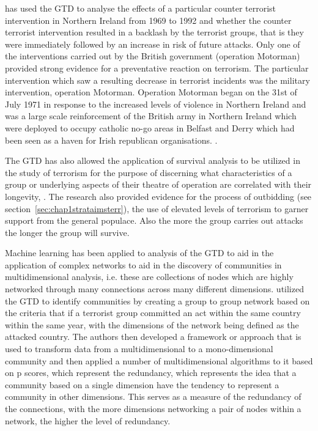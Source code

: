 \citep{lafree2009impact} has used the GTD to analyse the effects of a particular counter terrorist intervention in Northern Ireland from 1969 to 1992 and whether the counter terrorist intervention resulted in a backlash by the terrorist groups, that is they were immediately followed by an increase in risk of future attacks. Only one of the interventions carried out by the British government (operation Motorman) provided strong evidence for a preventative reaction on  terrorism. The particular intervention which saw a resulting decrease in terrorist incidents was the military intervention, operation Motorman. 
Operation Motorman began on the 31st of July 1971 in response to the increased levels of violence in Northern Ireland \citep{edwards2011northern} and was a large scale reinforcement of the British army in Northern Ireland which were deployed to occupy catholic no-go areas in Belfast and Derry which had been seen as a haven for Irish republican organisations. \citep{neumann2003myth}.

The GTD has also allowed the application of survival analysis to be utilized in the study of terrorism for the purpose of discerning what characteristics of a group or underlying aspects of their theatre of operation are correlated with their longevity, \citep{young2014survival}. The  research also provided evidence for the  process of outbidding (see section~\ref{sec:chap1strataimsterr}),  the use of elevated levels of terrorism to garner support from the general populace. Also the more the group carries out attacks the longer the group will survive.

Machine learning has been applied to analysis of the GTD to aid in the application of complex networks to aid in the discovery of communities in multidimensional analysis, i.e. these are collections of nodes which are highly networked through many connections across many different dimensions. \citep{berlingerio2011finding} utilized the GTD to identify communities by creating a group to group network based on the criteria that if a terrorist group committed an act within the same country within the same year, with the dimensions of the network being defined as the attacked country. The authors then developed a framework or approach that is used to transform data from a multidimensional to a mono-dimensional community and then applied a number of multidimensional algorithms to it based on p scores, which represent the redundancy, which represents the idea that a community based on a single dimension have the tendency to represent a community in other dimensions. This serves as a measure of the redundancy of the connections, with the more dimensions networking a pair of nodes within a network, the higher the level of redundancy. 

